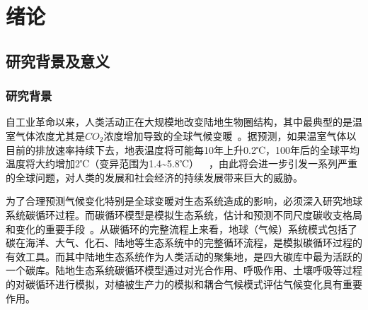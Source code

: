 \chapter{绪论}
\section{研究背景及意义}
\subsection{研究背景}

自工业革命以来，人类活动正在大规模地改变陆地生物圈结构，其中最典型的是温室气体浓度尤其是$CO_2$浓度增加导致的全球气候变暖~\cite{houghton2001climate}。据预测，如果温室气体以目前的排放速率持续下去，地表温度将可能每10年上升0.2℃，100年后的全球平均温度将大约增加2℃（变异范围为1.4\textasciitilde5.8℃）~\cite{Oliver2013Intergovernmental}~\cite{宋燕燕2006陆地碳循环模型的比较分析}，由此将会进一步引发一系列严重的全球问题，对人类的发展和社会经济的持续发展带来巨大的威胁。

为了合理预测气候变化特别是全球变暖对生态系统造成的影响，必须深入研究地球系统碳循环过程。而碳循环模型是模拟生态系统，估计和预测不同尺度碳收支格局和变化的重要手段~\cite{cao2003interannual}。从碳循环的完整流程上来看，地球（气候）系统模式包括了碳在海洋、大气、化石、陆地等生态系统中的完整循环流程，是模拟碳循环过程的有效工具。而其中陆地生态系统作为人类活动的聚集地，是四大碳库中最为活跃的一个碳库。陆地生态系统碳循环模型通过对光合作用、呼吸作用、土壤呼吸等过程的对碳循环进行模拟，对植被生产力的模拟和耦合气候模式评估气候变化具有重要作用。


